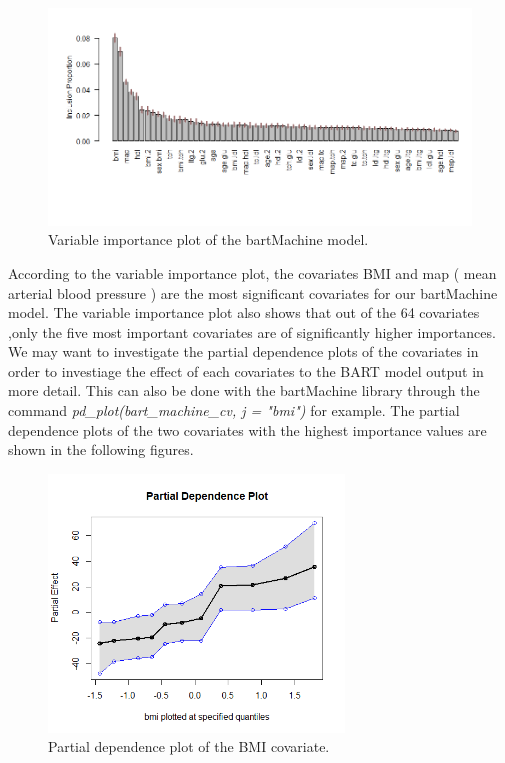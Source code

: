 \documentclass{usiinftr}
\begin{document}
\begin{figure}[h!] 
\centering
\includegraphics[width=\textwidth]{images/VarImp.png}
\caption{Variable importance plot of the bartMachine model.}
\label{VarImp}
\end{figure}

According to the variable importance plot, the covariates BMI and map ( mean arterial blood pressure ) are the most significant covariates for our bartMachine model. The variable importance plot also shows that out of the 64 covariates ,only the five most important covariates are of significantly higher importances. We may want to investigate the partial dependence plots of the covariates in order to investiage the effect of each covariates to the BART model output in more detail. This can also be done with the bartMachine library through the command \textit{pd\_plot(bart\_machine\_cv, j = "bmi")} for example. The partial dependence plots of the two covariates with the highest importance values are shown in the following figures.

\begin{figure}[h!] 
\centering
\includegraphics[width=0.7\textwidth]{images/PD_BMI.png}
\caption{Partial dependence plot of the BMI covariate.}
\label{PDBMI}
\end{figure}
\end{document}

